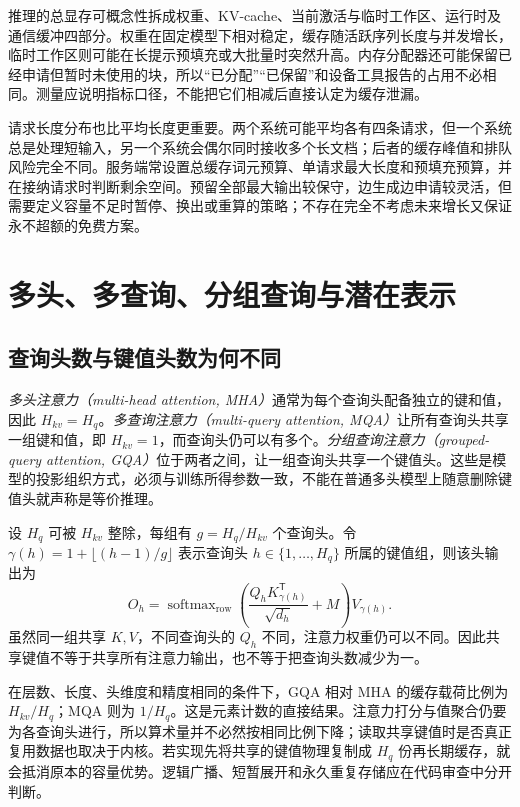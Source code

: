 \documentclass[UTF8,12pt,a4paper,fontset=fandol]{ctexart}
\begin{document}
推理的总显存可概念性拆成权重、KV-cache、当前激活与临时工作区、运行时及通信缓冲四部分。权重在固定模型下相对稳定，缓存随活跃序列长度与并发增长，临时工作区则可能在长提示预填充或大批量时突然升高。内存分配器还可能保留已经申请但暂时未使用的块，所以“已分配”“已保留”和设备工具报告的占用不必相同。测量应说明指标口径，不能把它们相减后直接认定为缓存泄漏。

请求长度分布也比平均长度更重要。两个系统可能平均各有四条请求，但一个系统总是处理短输入，另一个系统会偶尔同时接收多个长文档；后者的缓存峰值和排队风险完全不同。服务端常设置总缓存词元预算、单请求最大长度和预填充预算，并在接纳请求时判断剩余空间。预留全部最大输出较保守，边生成边申请较灵活，但需要定义容量不足时暂停、换出或重算的策略；不存在完全不考虑未来增长又保证永不超额的免费方案。

\section{多头、多查询、分组查询与潜在表示}
\label{sec:kv-heads}

\subsection{查询头数与键值头数为何不同}

\emph{多头注意力（multi-head attention, MHA）}通常为每个查询头配备独立的键和值，因此 $H_{kv}=H_q$。\emph{多查询注意力（multi-query attention, MQA）}让所有查询头共享一组键和值，即 $H_{kv}=1$，而查询头仍可以有多个\cite{mqa}。\emph{分组查询注意力（grouped-query attention, GQA）}位于两者之间，让一组查询头共享一个键值头\cite{gqa}。这些是模型的投影组织方式，必须与训练所得参数一致，不能在普通多头模型上随意删除键值头就声称是等价推理。

设 $H_q$ 可被 $H_{kv}$ 整除，每组有 $g=H_q/H_{kv}$ 个查询头。令 $\gamma(h)=1+\lfloor(h-1)/g\rfloor$ 表示查询头 $h\in\{1,\ldots,H_q\}$ 所属的键值组，则该头输出为
\begin{equation}
 O_h=\operatorname{softmax}_{\mathrm{row}}
 \left(\frac{Q_hK_{\gamma(h)}^{\mathsf T}}{\sqrt{d_h}}+M\right)
 V_{\gamma(h)}.
 \label{eq:kv-gqa}
\end{equation}
虽然同一组共享 $K,V$，不同查询头的 $Q_h$ 不同，注意力权重仍可以不同。因此共享键值不等于共享所有注意力输出，也不等于把查询头数减少为一。

在层数、长度、头维度和精度相同的条件下，GQA 相对 MHA 的缓存载荷比例为 $H_{kv}/H_q$；MQA 则为 $1/H_q$。这是元素计数的直接结果。注意力打分与值聚合仍要为各查询头进行，所以算术量并不必然按相同比例下降；读取共享键值时是否真正复用数据也取决于内核。若实现先将共享的键值物理复制成 $H_q$ 份再长期缓存，就会抵消原本的容量优势。逻辑广播、短暂展开和永久重复存储应在代码审查中分开判断。
\end{document}
